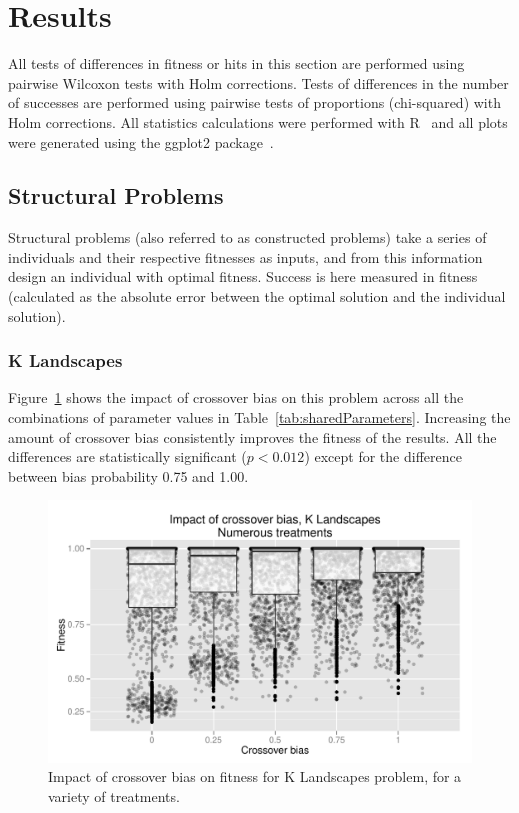 \documentclass{sig-alternate}
\begin{document}
\section{Results} \label{sec:Results}

All tests of differences in fitness or hits in this section are performed using pairwise Wilcoxon tests with Holm
corrections. Tests of differences in the number of successes are performed using pairwise tests of proportions
(chi-squared) with Holm corrections. All statistics calculations were performed with R~\cite{R} and all plots were
generated using the ggplot2 package~\cite{ggplot2Book}.

\subsection{Structural Problems}

Structural problems (also referred to as constructed problems) take a series of individuals and their respective
fitnesses as inputs, and from this information design an individual with optimal fitness. Success is here measured in
fitness (calculated as the absolute error between the optimal solution and the individual solution).

\subsubsection{K Landscapes}

Figure~\ref{fig:KLandscapes6_results} shows the impact of crossover bias on this problem across all the combinations of
parameter values in Table~\ref{tab:sharedParameters}. Increasing the amount of crossover bias consistently improves the
fitness of the results. All the differences are statistically significant ($p < 0.012$) except for the difference
between bias probability 0.75 and 1.00.

%
%
%
%

\begin{figure}
\centering
\includegraphics[width=0.45 \textwidth]{Plots/KLandscapes6_XO_bias_impact_transformed_boxplot_alpha075.pdf}
\caption{Impact of crossover bias on fitness for K Landscapes problem, for a variety of treatments.}
\label{fig:KLandscapes6_results}
\end{figure}
\end{document}
